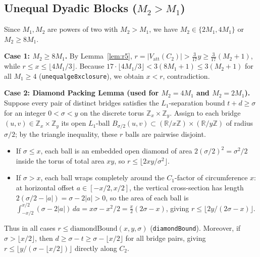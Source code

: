 \documentclass[11pt,reqno]{amsart}
\theoremstyle{plain}
\theoremstyle{definition}
\theoremstyle{remark}
\newcommand{\Vatt}{V_{\mathrm{att}}}
\DeclareRobustCommand{\_}{\ifmmode\text{\textunderscore}\else\textunderscore\allowbreak\fi}
\begin{document}
\subsection{Unequal Dyadic Blocks (\texorpdfstring{$M_2 > M_1$}{M2 > M1})}\label{subsec:unequal}

Since $M_1, M_2$ are powers of two with $M_2 > M_1$, we have $M_2 \in \{2M_1, 4M_1\}$ or $M_2 \ge 8M_1$.

\medskip
\noindent\textbf{Case 1: $M_2 \ge 8 M_1$.}
By Lemma~\ref{lem:r5}, $r = |\Vatt(C_2)| > \frac{3}{17} y \ge \frac{3}{17}(M_2 + 1)$, while $r \le x \le \lfloor 4M_1/3 \rfloor$. Because $17 \cdot \lfloor 4M_1/3 \rfloor < 3(8M_1 + 1) \le 3(M_2 + 1)$ for all $M_1 \ge 4$ (\texttt{unequal\_ge\_8x\_closure}), we obtain $x < r$, contradiction.

\medskip
\noindent\textbf{Case 2: Diamond Packing Lemma (used for $M_2 = 4M_1$ and $M_2 = 2M_1$).}
Suppose every pair of distinct bridges satisfies the $L_1$-separation bound $t + d \ge \sigma$ for an integer $0 < \sigma < y$ on the discrete torus $\mathbb{Z}_x \times \mathbb{Z}_y$. Assign to each bridge $(u, v) \in \mathbb{Z}_x \times \mathbb{Z}_y$ its open $L_1$-ball $B_{\sigma/2}(u, v) \subset (\mathbb{R}/x\mathbb{Z}) \times (\mathbb{R}/y\mathbb{Z})$ of radius $\sigma/2$; by the triangle inequality, these $r$ balls are pairwise disjoint.
\begin{itemize}[leftmargin=1.6em]
  \item If $\sigma \le x$, each ball is an embedded open diamond of area $2(\sigma/2)^2 = \sigma^2 / 2$ inside the torus of total area $xy$, so $r \le \lfloor 2xy / \sigma^2 \rfloor$.
  \item If $\sigma > x$, each ball wraps completely around the $C_1$-factor of circumference $x$: at horizontal offset $a \in [-x/2, x/2]$, the vertical cross-section has length $2(\sigma/2 - |a|) = \sigma - 2|a| > 0$, so the area of each ball is $\int_{-x/2}^{x/2} (\sigma - 2|a|)\,da = x\sigma - x^2/2 = \frac{x}{2}(2\sigma - x)$, giving $r \le \lfloor 2y / (2\sigma - x) \rfloor$.
\end{itemize}
Thus in all cases $r \le \mathrm{diamondBound}(x, y, \sigma)$ (\texttt{diamondBound}). Moreover, if $\sigma > \lfloor x/2 \rfloor$, then $d \ge \sigma - t \ge \sigma - \lfloor x/2 \rfloor$ for all bridge pairs, giving $r \le \lfloor y / (\sigma - \lfloor x/2 \rfloor) \rfloor$ directly along $C_2$.
\end{document}
